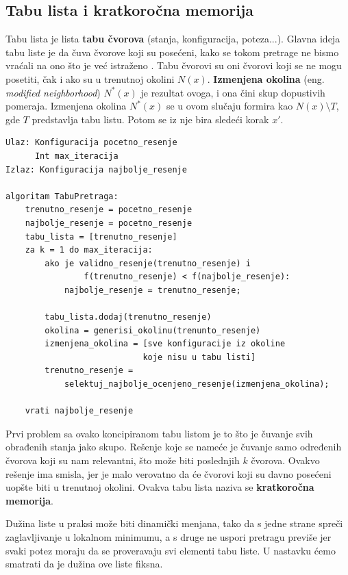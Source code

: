 \documentclass[a4paper]{article}
\begin{document}
\subsection{Tabu lista i kratkoročna memorija}
Tabu lista je lista \textbf{tabu čvorova} (stanja, konfiguracija, poteza...). Glavna ideja tabu liste je da čuva čvorove koji su posećeni, kako se tokom pretrage ne bismo vraćali na ono što je već istraženo \cite{edelkamp}. Tabu čvorovi su oni čvorovi koji se ne mogu posetiti, čak i ako su u trenutnoj okolini $N(x)$. \textbf{Izmenjena okolina} (eng. \textit{modified neighborhood}) $N^*(x)$ je rezultat ovoga, i ona čini skup dopustivih pomeraja. Izmenjena okolina $N^*(x)$ se u ovom slučaju formira kao $N(x)\setminus T$, gde $T$ predstavlja tabu listu. Potom se iz nje bira sledeći korak $x'$. \cite{tabusearchbook}\\

\begin{lstlisting}
Ulaz: Konfiguracija pocetno_resenje
      Int max_iteracija
Izlaz: Konfiguracija najbolje_resenje

algoritam TabuPretraga:
    trenutno_resenje = pocetno_resenje
    najbolje_resenje = pocetno_resenje    
    tabu_lista = [trenutno_resenje]
    za k = 1 do max_iteracija: 
        ako je validno_resenje(trenutno_resenje) i 
                f(trenutno_resenje) < f(najbolje_resenje):
            najbolje_resenje = trenutno_resenje;
        
        tabu_lista.dodaj(trenutno_resenje)
        okolina = generisi_okolinu(trenunto_resenje)
        izmenjena_okolina = [sve konfiguracije iz okoline 
                            koje nisu u tabu listi]
        trenutno_resenje = 
            selektuj_najbolje_ocenjeno_resenje(izmenjena_okolina);

    vrati najbolje_resenje
\end{lstlisting}

Prvi problem sa ovako koncipiranom tabu listom je to što je čuvanje svih obrađenih stanja jako skupo.\cite{coursera} Rešenje koje se nameće je čuvanje samo određenih čvorova koji su nam relevantni, što može biti poslednjih $k$ čvorova. Ovakvo rešenje ima smisla, jer je malo verovatno da će čvorovi koji su davno posećeni uopšte biti u trenutnoj okolini. Ovakva tabu lista naziva se \textbf{kratkoročna memorija}.\cite{tabusearchbook}

Dužina liste u praksi može biti dinamički menjana, tako da s jedne strane spreči zaglavljivanje u lokalnom minimumu, a s druge ne uspori pretragu previše jer svaki potez moraju da se proveravaju svi elementi tabu liste. U nastavku ćemo smatrati da je dužina ove liste fiksna.
\end{document}
